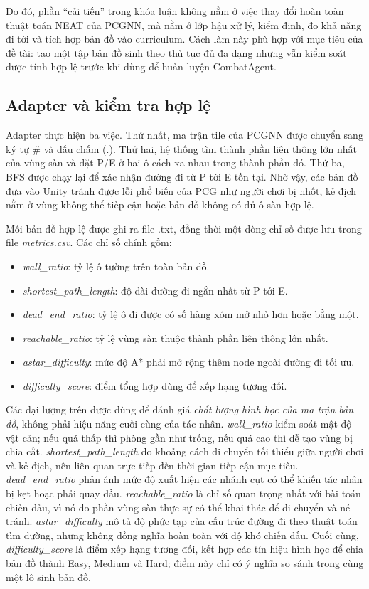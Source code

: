 Do đó, phần ``cải tiến'' trong khóa luận không nằm ở việc thay đổi hoàn toàn thuật toán NEAT của PCGNN, mà nằm ở lớp hậu xử lý, kiểm định, đo khả năng đi tới và tích hợp bản đồ vào curriculum. Cách làm này phù hợp với mục tiêu của đề tài: tạo một tập bản đồ sinh theo thủ tục đủ đa dạng nhưng vẫn kiểm soát được tính hợp lệ trước khi dùng để huấn luyện CombatAgent.

\subsection{Adapter và kiểm tra hợp lệ}

Adapter thực hiện ba việc. Thứ nhất, ma trận tile của PCGNN được chuyển sang ký tự \# và dấu chấm (.). Thứ hai, hệ thống tìm thành phần liên thông lớn nhất của vùng sàn và đặt P/E ở hai ô cách xa nhau trong thành phần đó. Thứ ba, BFS được chạy lại để xác nhận đường đi từ P tới E tồn tại. Nhờ vậy, các bản đồ đưa vào Unity tránh được lỗi phổ biến của PCG như người chơi bị nhốt, kẻ địch nằm ở vùng không thể tiếp cận hoặc bản đồ không có đủ ô sàn hợp lệ.

Mỗi bản đồ hợp lệ được ghi ra file .txt, đồng thời một dòng chỉ số được lưu trong file \emph{metrics.csv}. Các chỉ số chính gồm:

\begin{itemize}
    \item \emph{wall\_ratio}: tỷ lệ ô tường trên toàn bản đồ.
    \item \emph{shortest\_path\_length}: độ dài đường đi ngắn nhất từ P tới E.
    \item \emph{dead\_end\_ratio}: tỷ lệ ô đi được có số hàng xóm mở nhỏ hơn hoặc bằng một.
    \item \emph{reachable\_ratio}: tỷ lệ vùng sàn thuộc thành phần liên thông lớn nhất.
    \item \emph{astar\_difficulty}: mức độ A* phải mở rộng thêm node ngoài đường đi tối ưu.
    \item \emph{difficulty\_score}: điểm tổng hợp dùng để xếp hạng tương đối.
\end{itemize}

Các đại lượng trên được dùng để đánh giá \emph{chất lượng hình học của ma trận bản đồ}, không phải hiệu năng cuối cùng của tác nhân. \emph{wall\_ratio} kiểm soát mật độ vật cản; nếu quá thấp thì phòng gần như trống, nếu quá cao thì dễ tạo vùng bị chia cắt. \emph{shortest\_path\_length} đo khoảng cách di chuyển tối thiểu giữa người chơi và kẻ địch, nên liên quan trực tiếp đến thời gian tiếp cận mục tiêu. \emph{dead\_end\_ratio} phản ánh mức độ xuất hiện các nhánh cụt có thể khiến tác nhân bị kẹt hoặc phải quay đầu. \emph{reachable\_ratio} là chỉ số quan trọng nhất với bài toán chiến đấu, vì nó đo phần vùng sàn thực sự có thể khai thác để di chuyển và né tránh. \emph{astar\_difficulty} mô tả độ phức tạp của cấu trúc đường đi theo thuật toán tìm đường, nhưng không đồng nghĩa hoàn toàn với độ khó chiến đấu. Cuối cùng, \emph{difficulty\_score} là điểm xếp hạng tương đối, kết hợp các tín hiệu hình học để chia bản đồ thành Easy, Medium và Hard; điểm này chỉ có ý nghĩa so sánh trong cùng một lô sinh bản đồ.


